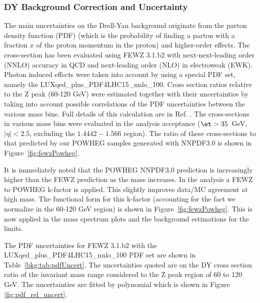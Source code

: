\subsubsection{DY Background Correction and Uncertainty}
\label{sec:dyBkgCorr}
The main uncertainties on the Drell-Yan background originate from the parton density function (PDF) (which is the probability of finding a parton with a fraction $x$ of the proton momentum in the proton) and higher-order effects.
The cross-section has been evaluated using FEWZ 3.1.b2 with next-next-leading order (NNLO) accuracy in QCD and next-leading order (NLO) in electroweak (EWK).
Photon induced effects were taken into account by using a special PDF set, namely the LUXqed\_plus\_PDF4LHC15\_nnlo\_100.
Cross section ratios relative to the Z peak (60-120 GeV) were estimated together with their uncertainties by taking into account possible correlations
of the PDF uncertainties between the various mass bins. Full details of this calculation are in Ref. \cite{AN-16-053}.
The cross-sections in various mass bins were evaluated in the analysis acceptance ($\et>35$~GeV, $|\eta|<2.5$, excluding the $1.4442-1.566$ region).
The ratio of these cross-sections to that predicted by our POWHEG samples generated with NNPDF3.0 is shown in Figure~\ref{fig:fewzPowheg}.


It is immediately noted that the POWHEG NNPDF3.0 prediction is increasingly higher than the FEWZ prediction as the mass increases.
In the analysis a FEWZ to POWHEG k-factor is applied.
This slightly improves data/MC agreement at high mass. The functional form for
this k-factor (accounting for the fact we normalize in the 60-120 GeV region) is shown
in Figure~\ref{fig:fewzPowheg}. This is now applied in the mass spectrum plots and the background estimations for the limits.

The PDF uncertainties for FEWZ 3.1.b2 with the LUXqed\_plus\_PDF4LHC15\_nnlo\_100 PDF set are shown in Table~\ref{bkg:tab:pdfUncert}.
The uncertainties quoted are on the DY cross section ratio of the invariant mass range considered to the Z peak region of 60 to 120 GeV. The uncertainties are fitted by polynomial which is shown in Figure \ref{fig:pdf_rel_uncert}.


